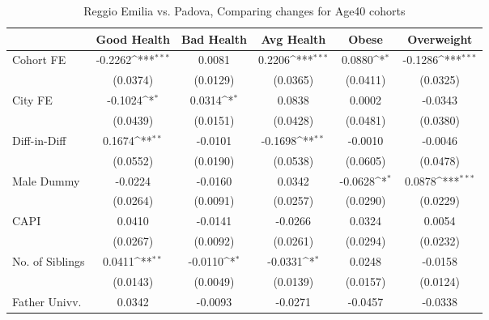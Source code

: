 \begin{table}[htbp]\centering
\def\sym#1{\ifmmode^{#1}\else\(^{#1}\)\fi}
\caption{Reggio Emilia vs. Padova, Comparing changes for Age40 cohorts}
\begin{tabular}{l*{5}{c}}
\toprule
            &\multicolumn{1}{c}{Good Health}&\multicolumn{1}{c}{Bad Health}&\multicolumn{1}{c}{Avg Health}&\multicolumn{1}{c}{Obese}&\multicolumn{1}{c}{Overweight}\\
\midrule
Cohort FE   &     -0.2262\sym{***}&      0.0081         &      0.2206\sym{***}&      0.0880\sym{*}  &     -0.1286\sym{***}\\
            &    (0.0374)         &    (0.0129)         &    (0.0365)         &    (0.0411)         &    (0.0325)         \\
\addlinespace
City FE     &     -0.1024\sym{*}  &      0.0314\sym{*}  &      0.0838         &      0.0002         &     -0.0343         \\
            &    (0.0439)         &    (0.0151)         &    (0.0428)         &    (0.0481)         &    (0.0380)         \\
\addlinespace
Diff-in-Diff&      0.1674\sym{**} &     -0.0101         &     -0.1698\sym{**} &     -0.0010         &     -0.0046         \\
            &    (0.0552)         &    (0.0190)         &    (0.0538)         &    (0.0605)         &    (0.0478)         \\
\addlinespace
Male Dummy  &     -0.0224         &     -0.0160         &      0.0342         &     -0.0628\sym{*}  &      0.0878\sym{***}\\
            &    (0.0264)         &    (0.0091)         &    (0.0257)         &    (0.0290)         &    (0.0229)         \\
\addlinespace
CAPI        &      0.0410         &     -0.0141         &     -0.0266         &      0.0324         &      0.0054         \\
            &    (0.0267)         &    (0.0092)         &    (0.0261)         &    (0.0294)         &    (0.0232)         \\
\addlinespace
No. of Siblings&      0.0411\sym{**} &     -0.0110\sym{*}  &     -0.0331\sym{*}  &      0.0248         &     -0.0158         \\
            &    (0.0143)         &    (0.0049)         &    (0.0139)         &    (0.0157)         &    (0.0124)         \\
\addlinespace
Father Univv.&      0.0342         &     -0.0093         &     -0.0271         &     -0.0457         &     -0.0338         \\

\end{tabular}
\end{table}

